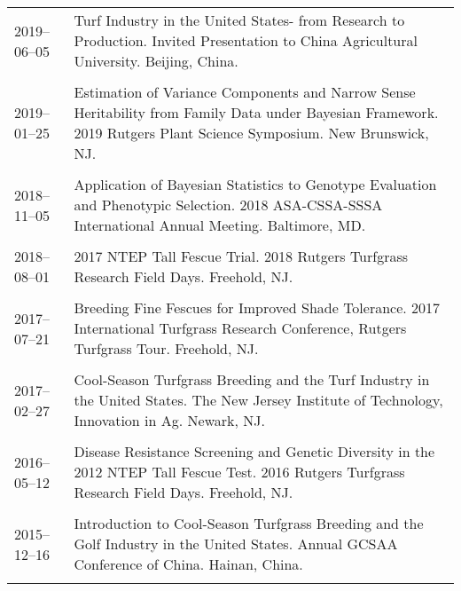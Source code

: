 \documentclass[letterpaper,11pt, english]{article}
\begin{document}
\begin{flushleft}
\begin{tabularx}{\textwidth}{@{}lX@{}}
    \\[-0.2cm]
    2019--06--05 \hspace{1cm} & Turf Industry in the United States- from Research to Production. Invited Presentation to China Agricultural University. Beijing, China. \\
    \\[-0.2cm]
    2019--01--25 \hspace{1cm} & Estimation of Variance Components and Narrow Sense Heritability from Family Data under Bayesian Framework. 2019 Rutgers Plant Science Symposium. New Brunswick, NJ. \\
    \\[-0.2cm]
    2018--11--05 \hspace{1cm} & Application of Bayesian Statistics to Genotype Evaluation and Phenotypic Selection. 2018 ASA-CSSA-SSSA International Annual Meeting. Baltimore, MD. \\
    \\[-0.2cm]
    2018--08--01 \hspace{1cm} & 2017 NTEP Tall Fescue Trial. 2018 Rutgers Turfgrass Research Field Days. Freehold, NJ. \\
    \\[-0.2cm]
    2017--07--21 \hspace{1cm} & Breeding Fine Fescues for Improved Shade Tolerance. 2017 International Turfgrass Research Conference, Rutgers Turfgrass Tour. Freehold, NJ. \\
    \\[-0.2cm]
    2017--02--27 \hspace{1cm} & Cool-Season Turfgrass Breeding and the Turf Industry in the United States. The New Jersey Institute of Technology, Innovation in Ag. Newark, NJ. \\
    \\[-0.2cm]
    2016--05--12 \hspace{1cm} & Disease Resistance Screening and Genetic Diversity in the 2012 NTEP Tall Fescue Test. 2016 Rutgers Turfgrass Research Field Days. Freehold, NJ. \\
    \\[-0.2cm]
    2015--12--16 \hspace{1cm} & Introduction to Cool-Season Turfgrass Breeding and the Golf Industry in the United States. Annual GCSAA Conference of China. Hainan, China. \\
    \\[-0.2cm] 
  \end{tabularx}
\end{flushleft}
\end{document}
